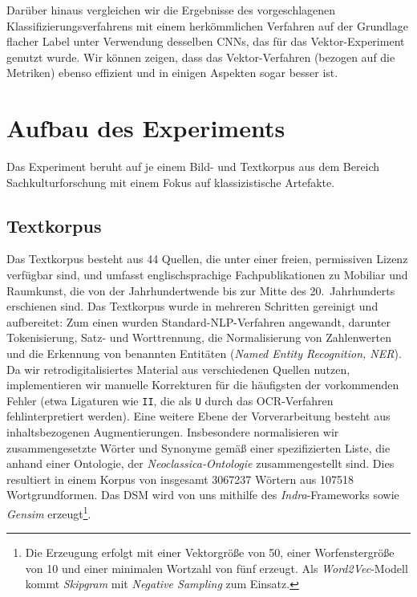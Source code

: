 Darüber hinaus vergleichen wir die Ergebnisse des vorgeschlagenen Klassifizierungsverfahrens mit einem herkömmlichen Verfahren auf der Grundlage flacher Label unter Verwendung desselben CNNs, das für das Vektor-Experiment genutzt wurde. Wir können zeigen, dass das Vektor-Verfahren (bezogen auf die Metriken) ebenso effizient und in einigen Aspekten sogar besser ist.

\section{Aufbau des Experiments}
Das Experiment beruht auf je einem Bild- und Textkorpus aus dem Bereich Sachkulturforschung mit einem Fokus auf klassizistische Artefakte.

\subsection{Textkorpus}
Das Textkorpus besteht aus 44 Quellen, die unter einer freien, permissiven Lizenz verfügbar sind, und umfasst englischsprachige Fachpublikationen zu Mobiliar und Raumkunst, die von  der Jahrhundertwende bis zur Mitte des 20.~Jahrhunderts erschienen sind. Das Textkorpus wurde in mehreren Schritten gereinigt und aufbereitet: Zum einen wurden Standard-NLP-Verfahren angewandt, darunter Tokenisierung, Satz- und Worttrennung, die Normalisierung von Zahlenwerten und die Erkennung von benannten Entitäten (\emph{Named Entity Recognition, NER}). Da wir retrodigitalisiertes Material aus verschiedenen Quellen nutzen, implementieren wir manuelle Korrekturen für die häufigsten der vorkommenden Fehler (etwa Ligaturen wie \texttt{II}, die als \texttt{U} durch das OCR-Verfahren fehlinterpretiert werden). Eine weitere Ebene der Vorverarbeitung besteht aus inhaltsbezogenen Augmentierungen. Insbesondere normalisieren wir zusammengesetzte Wörter und Synonyme gemäß einer spezifizierten Liste, die anhand einer Ontologie, der \emph{Neoclassica-Ontologie} \parencite{donig_NeoclassicaMultilingualDomainOntology_2016} zusammengestellt sind. Dies resultiert in einem Korpus von insgesamt \num{3067237} Wörtern aus \num{107518} Wortgrundformen.
Das DSM wird von uns mithilfe des \emph{Indra}-Frameworks \parencite{sales_IndraWordEmbeddingSemanticRelatedness_2018a} sowie \emph{Gensim} \parencite{rehurek_lrec} erzeugt\footnote{Die Erzeugung erfolgt mit einer Vektorgröße von 50, einer Worfenstergröße von 10 und einer minimalen Wortzahl von fünf erzeugt. Als \emph{Word2Vec}-Modell kommt \emph{Skipgram} \parencite{mikolov_EfficientEstimationWordRepresentationsVector_2013} mit \emph{Negative Sampling} zum Einsatz.}.


